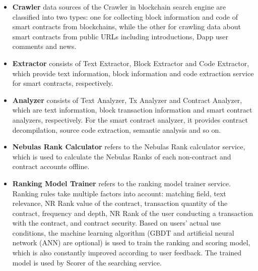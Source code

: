 \begin{itemize}
	\item \textbf{Crawler}  data sources of the Crawler in blockchain search engine are classified into two types: one for collecting block information and code of smart contracts from blockchains, while the other for crawling data about smart contracts from public URLs including introductions, Dapp user comments and news.
	\item \textbf{Extractor} consists of Text Extractor, Block Extractor and Code Extractor, which provide text information, block information and code extraction service for smart contracts, respectively.
	\item \textbf{Analyzer} consists of Text Analyzer, Tx Analyzer and Contract Analyzer, which are text information, block transaction information and smart contract analyzers, respectively. For the smart contract analyzer, it provides contract decompilation, source code extraction, semantic analysis and so on.
	\item \textbf{Nebulas Rank Calculator} refers to the Nebulas Rank calculator service, which is used to calculate the Nebulas Ranks of each non-contract and contract accounts offline.
	\item \textbf{Ranking Model Trainer} refers to the ranking model trainer service. Ranking rules take multiple factors into account: matching field, text relevance, NR Rank value of the contract, transaction quantity of the contract, frequency and depth, NR Rank of the user conducting a transaction with the contract, and contract security. Based on users' actual use conditions, the machine learning algorithm (GBDT and artificial neural network (ANN) are optional) is used to train the ranking and scoring model, which is also constantly improved according to user feedback. The trained model is used by Scorer of the searching service.

\end{itemize}
